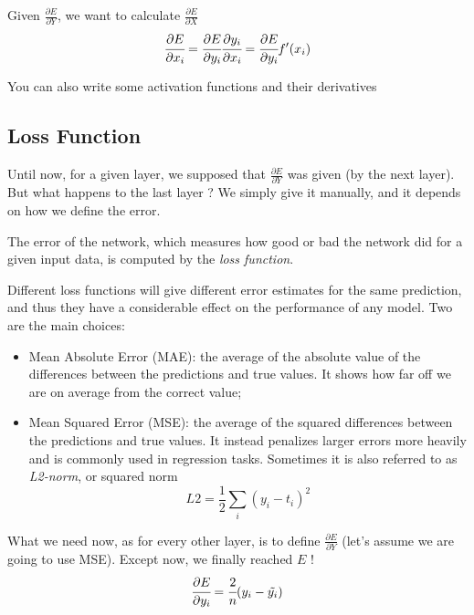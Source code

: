 Given $\frac{\partial E}{\partial Y}$, we want to calculate $\frac{\partial E}{\partial X}$
\begin{equation}
	\cfrac{\partial E}{\partial x_i} = \cfrac{\partial E}{\partial y_i}\cfrac{\partial y_i}{\partial x_i} = \cfrac{\partial E}{\partial y_i} f'(x_i) 
\end{equation}


You can also write some activation functions and their derivatives


\subsection{Loss Function}
Until now, for a given layer, we supposed that $\frac{\partial E}{\partial Y}$ was given (by the next layer). But what happens to the last layer ? We simply give it manually, and it depends on how we define the error.


The error of the network, which measures how good or bad the network did for a given input data, is computed by the \emph{loss function}.

Different loss functions will give different error estimates for the same prediction, and thus they have a considerable effect on the performance of any model. Two are the main choices:

\begin{itemize}
	\tightlist
	\item Mean Absolute Error (MAE): the average of the absolute value of the differences between the predictions and true values. It shows how far off we are on average from the correct value;
	\item Mean Squared Error (MSE): the average of the squared differences between the predictions and true values. It instead penalizes larger errors more heavily and is commonly used in regression tasks. Sometimes it is also referred to as \emph{L2-norm}, or squared norm
	\begin{equation}
		L2 = \frac{1}{2}\sum_i (y_i - t_i)^2
	\end{equation} 
\end{itemize}

What we need now, as for every other layer, is to define $\frac{\partial E}{\partial Y}$ (let's assume we are going to use MSE). Except now, we finally reached $E$ !
\begin{equation}
	\cfrac{\partial E}{\partial y_i} = \cfrac{2}{n} (y_i - \tilde{y_i}) 
\end{equation}

